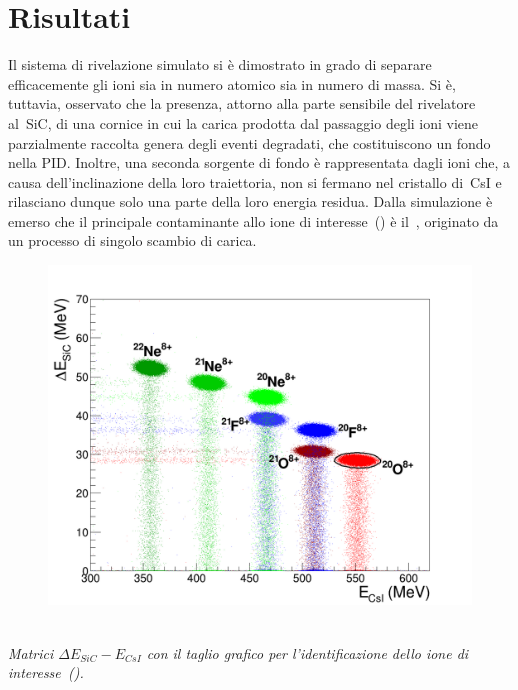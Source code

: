 \documentclass[10pt,foldmark]{leaflet}
\begin{document}
\section{Risultati}

Il sistema di rivelazione simulato si è dimostrato in grado di separare efficacemente gli ioni sia in numero atomico sia in numero di massa.
Si è, tuttavia, osservato che la presenza, attorno alla parte sensibile del rivelatore al~SiC, di una cornice in cui la carica prodotta dal passaggio degli ioni viene parzialmente raccolta genera degli eventi degradati, che costituiscono un fondo nella PID.
Inoltre, una seconda sorgente di fondo è rappresentata dagli ioni che, a causa dell'inclinazione della loro traiettoria, non si fermano nel cristallo di~CsI e rilasciano dunque solo una parte della loro energia residua.
Dalla simulazione è emerso che il principale contaminante allo ione di interesse~() è il~, originato da un processo di singolo scambio di carica.
\begin{figure} [!t]
	\centering
	\includegraphics[width=0.7\columnwidth, keepaspectratio]{Grafici_Tesi2/PIDnew/deltaE_Ecsi_quadrata_taglio_menoeventi2.png}
\end{figure}\\
\textit{ Matrici $\Delta E_{SiC} - E_{CsI}$ con il taglio grafico per l'identificazione dello ione di interesse~().}
\end{document}
